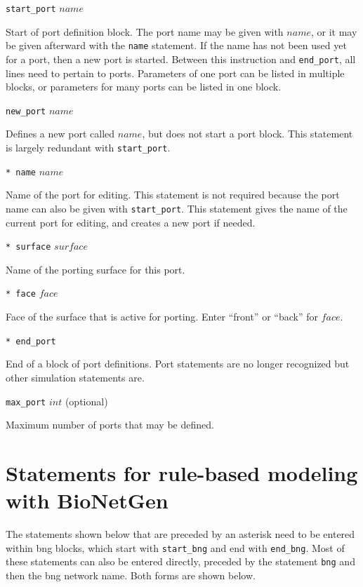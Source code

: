 \documentclass {scrbook}
\newcommand {\ttt} {\texttt}
\begin{document}
\begin{description}

\item{\ttt{start\_port} $name$}

Start of port definition block. The port name may be given with $name$, or it may be given afterward with the \ttt{name} statement. If the name has not been used yet for a port, then a new port is started. Between this instruction and \ttt{end\_port}, all lines need to pertain to ports. Parameters of one port can be listed in multiple blocks, or parameters for many ports can be listed in one block.

\item{\ttt{new\_port} $name$}

Defines a new port called $name$, but does not start a port block. This statement is largely redundant with \ttt{start\_port}.

\item{\ttt{* name} $name$}

Name of the port for editing. This statement is not required because the port name can also be given with \ttt{start\_port}. This statement gives the name of the current port for editing, and creates a new port if needed.

\item{\ttt{* surface} $surface$}

Name of the porting surface for this port.

\item{\ttt{* face} $face$}

Face of the surface that is active for porting. Enter ``front'' or ``back'' for $face$.

\item{\ttt{* end\_port}}

End of a block of port definitions. Port statements are no longer recognized but other simulation statements are.

\item{\ttt{max\_port} $int$} (optional)

Maximum number of ports that may be defined.

\end{description}

\section{Statements for rule-based modeling with BioNetGen}

The statements shown below that are preceded by an asterisk need to be entered within bng blocks, which start with \ttt{start\_bng} and end with \ttt{end\_bng}. Most of these statements can also be entered directly, preceded by the statement \ttt{bng} and then the bng network name. Both forms are shown below.
\end{document}
